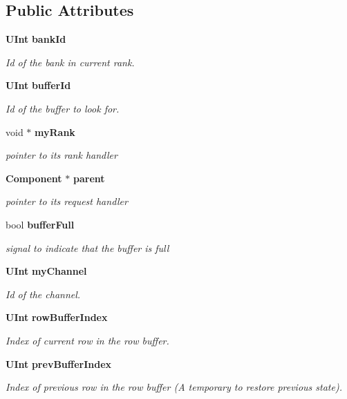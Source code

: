 \subsection*{Public Attributes}
\begin{CompactItemize}
\item 
{\bf UInt} {\bf bankId}
\begin{CompactList}\small\item\em Id of the bank in current rank. \item\end{CompactList}\item 
{\bf UInt} {\bf bufferId}
\begin{CompactList}\small\item\em Id of the buffer to look for. \item\end{CompactList}\item 
void $\ast$ {\bf myRank}
\begin{CompactList}\small\item\em pointer to its rank handler \item\end{CompactList}\item 
{\bf Component} $\ast$ {\bf parent}
\begin{CompactList}\small\item\em pointer to its request handler \item\end{CompactList}\item 
bool {\bf bufferFull}
\begin{CompactList}\small\item\em signal to indicate that the buffer is full \item\end{CompactList}\item 
{\bf UInt} {\bf myChannel}
\begin{CompactList}\small\item\em Id of the channel. \item\end{CompactList}\item 
{\bf UInt} {\bf rowBufferIndex}
\begin{CompactList}\small\item\em Index of current row in the row buffer. \item\end{CompactList}\item 
{\bf UInt} {\bf prevBufferIndex}
\begin{CompactList}\small\item\em Index of previous row in the row buffer (A temporary to restore previous state). \item\end{CompactList}\item 

\end{CompactItemize}
